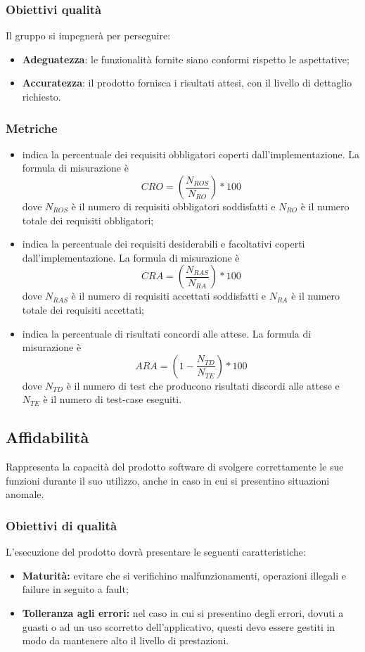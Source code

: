 \documentclass[PianoDiQualifica.tex]{subfiles}
\begin{document}
\subsubsection{Obiettivi qualità}
Il gruppo \gruppo si impegnerà per perseguire:
\begin{itemize}
	\item \textbf{Adeguatezza}: le funzionalità fornite siano conformi rispetto le aspettative;
	\item \textbf{Accuratezza}: il prodotto fornisca i risultati attesi, con il livello di dettaglio richiesto. 
\end{itemize}	
\subsubsection{Metriche}
\begin{itemize}
	\item {} indica la percentuale dei requisiti obbligatori coperti dall'implementazione. La formula di misurazione è \[CRO=(\frac{N_{ROS}}{N_{RO}})*100\] dove $ N_{ROS} $ è il numero di requisiti obbligatori soddisfatti e $ N_{RO} $ è il numero totale dei requisiti obbligatori;
	\item {} indica la percentuale dei requisiti desiderabili e facoltativi coperti dall'implementazione. La formula di misurazione è \[CRA=(\frac{N_{RAS}}{N_{RA}})*100\] dove $ N_{RAS} $ è il numero di requisiti accettati soddisfatti e $ N_{RA } $ è il numero totale dei requisiti accettati;
	\item {} indica la percentuale di risultati concordi alle attese. La formula di misurazione è \[ARA=(1-\frac{N_{TD}}{N_{TE}})*100\] dove $ N_{TD} $ è il numero di test che producono risultati discordi alle attese e $ N_{TE} $ è il numero di test-case eseguiti.
\end{itemize}
		
\subsection{Affidabilità}
Rappresenta la capacità del prodotto software di svolgere correttamente le sue funzioni durante il suo utilizzo, anche in caso in cui si presentino situazioni anomale.
\subsubsection{Obiettivi di qualità}
L'esecuzione del prodotto dovrà presentare le seguenti caratteristiche:
\begin{itemize}
	\item \textbf{Maturità:} evitare che si verifichino malfunzionamenti, operazioni illegali e failure in seguito a fault;
	\item \textbf{Tolleranza agli errori:} nel caso in cui si presentino degli errori, dovuti a guasti o ad un uso scorretto dell'applicativo, questi devo essere gestiti in modo da mantenere alto il livello di prestazioni.
\end{itemize}
\end{document}
